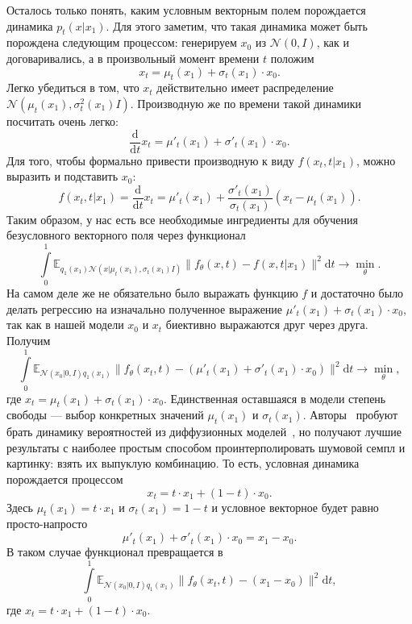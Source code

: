 \documentclass[12pt]{article}
\theoremstyle{definition}
\begin{document}
Осталось только понять, каким условным векторным полем порождается динамика $p_t(x | x_1)$. Для этого заметим, что такая динамика может быть порождена следующим процессом: генерируем $x_0$ из $\mathcal{N}(0, I)$, как и договаривались, а в произвольный момент времени $t$ положим
\[
    x_t = \mu_t(x_1) + \sigma_t(x_1) \cdot x_0.
\]
Легко убедиться в том, что $x_t$ действительно имеет распределение $\mathcal{N}(\mu_t(x_1), \sigma^2_t(x_1) I)$. Производную же по времени такой динамики посчитать очень легко:
\[
    \frac{\mathrm{d}}{\mathrm{d} t} x_t = \mu'_t(x_1) + \sigma'_t(x_1) \cdot x_0.
\]
Для того, чтобы формально привести производную к виду $f(x_t, t |x_1)$, можно выразить и подставить $x_0$:
\[
    f(x_t, t | x_1) = \frac{\mathrm{d}}{\mathrm{d} t} x_t = \mu'_t(x_1) + \frac{\sigma'_t(x_1)}{\sigma_t(x_1)}(x_t - \mu_t(x_1)).
\]
Таким образом, у нас есть все необходимые ингредиенты для обучения безусловного векторного поля через функционал
\[
    \int\limits_{0}^{1}\mathbb{E}_{q_1(x_1)\mathcal{N}(x | \mu_t(x_1), \sigma_t(x_1) I)} \|f_\theta(x, t) - f(x, t | x_1) \|^2 \mathrm{d} t \rightarrow \min\limits_{\theta}.
\]
На самом деле же не обязательно было выражать функцию $f$ и достаточно было делать регрессию на изначально полученное выражение $\mu'_t(x_1) + \sigma_t(x_1) \cdot x_0$, так как в нашей модели $x_0$ и $x_t$ биективно выражаются друг через друга. Получим
\[
    \int\limits_{0}^{1}\mathbb{E}_{\mathcal{N}(x_0 | 0, I)q_1(x_1)}\|f_\theta(x_t, t) - \left(\mu'_t(x_1) + \sigma'_t(x_1) \cdot x_0 \right) \|^2 \mathrm{d}t \rightarrow \min\limits_{\theta},
\]
где $x_t = \mu_t(x_1) + \sigma_t(x_1) \cdot x_0$.
Единственная оставшаяся в модели степень свободы --- выбор конкретных значений $\mu_t(x_1)$ и $\sigma_t(x_1)$.  Авторы~\cite{lipman2022flow} пробуют брать динамику вероятностей из диффузионных моделей~\cite{song2020score}, но получают лучшие результаты с наиболее простым способом проинтерполировать шумовой семпл и картинку: взять их выпуклую комбинацию. То есть, условная динамика порождается процессом
\[
    x_t = t \cdot x_1 + (1 - t) \cdot x_0.
\]
Здесь $\mu_t(x_1) = t \cdot x_1$ и $\sigma_t(x_1) = 1 - t$ и условное векторное будет равно просто-напросто
\[
    \mu'_t(x_1) + \sigma'_t(x_1) \cdot x_0 = x_1 - x_0.
\]
В таком случае функционал превращается в
\begin{equation}
\label{eq:fm_ot}
\int\limits_{0}^{1}\mathbb{E}_{\mathcal{N}(x_0 | 0, I)q_1(x_1)}\|f_\theta(x_t, t) - (x_1 - x_0) \|^2 \mathrm{d} t,
\end{equation} 
где $x_t = t \cdot x_1 + (1 - t) \cdot x_0$.
\end{document}
